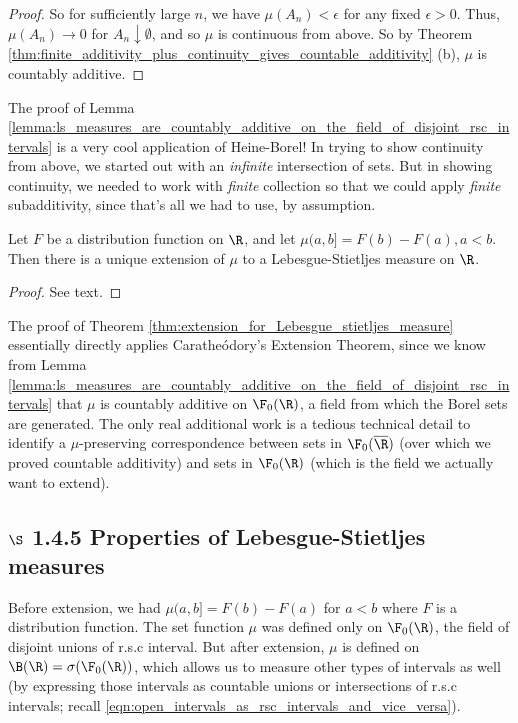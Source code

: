 \documentclass{article} %
\begin{document}
\begin{proof}
So for sufficiently large $n$, we have $\mu(A_n) < \epsilon$ for any fixed $\epsilon >0$. Thus, $\mu(A_n) \to 0$ for $A_n \downarrow \emptyset$, and so $\mu$ is continuous from above.  So by Theorem \ref{thm:finite_additivity_plus_continuity_gives_countable_additivity} (b), $\mu$ is countably additive.
\end{proof}

\begin{remark}
The proof of Lemma \ref{lemma:ls_measures_are_countably_additive_on_the_field_of_disjoint_rsc_intervals} is a very cool application of Heine-Borel!  In trying to show continuity from above, we started out with an \textit{infinite} intersection of sets.  But in showing continuity, we needed to work with \textit{finite} collection so that we could apply \textit{finite} subadditivity, since that's all we had to use, by assumption. 
\end{remark}

\begin{theorem}
Let $F$ be a distribution function on $\R$, and let $\mu(a,b] = F(b) - F(a), a < b$.  Then there is a unique extension of $\mu$ to a Lebesgue-Stietljes measure on $\R$.
\label{thm:extension_for_Lebesgue_stietljes_measure}
\end{theorem}

\begin{proof}
See text. 	
\end{proof}

\begin{remark}
The proof of Theorem \ref{thm:extension_for_Lebesgue_stietljes_measure}
essentially directly applies Carathe\'odory's Extension Theorem, since we know from Lemma \ref{lemma:ls_measures_are_countably_additive_on_the_field_of_disjoint_rsc_intervals} that $\mu$ is countably additive on $\F_0(\R)$, a field from which the Borel sets are generated.  The only real additional work is a tedious technical detail to identify a $\mu$-preserving correspondence between sets in $\F_0(\overline{\R})$ (over which we proved countable additivity) and sets in $\F_0(\R)$ (which is the field we actually want to extend).
\end{remark}

  \subsection{$\S$ 1.4.5 Properties of Lebesgue-Stietljes measures}
 Before extension, we had $\mu(a,b] =F(b) - F(a)$ for $a < b$ where $F$ is a distribution function. The set function $\mu$ was defined only on $\F_0(\R)$, the field of disjoint unions of r.s.c interval.  But after extension, $\mu$ is defined on $\B(\R) = \sigma(\F_0(\R))$, which allows us to measure other types of intervals as well (by expressing those intervals as countable unions or intersections of r.s.c intervals; recall \eqref{eqn:open_intervals_as_rsc_intervals_and_vice_versa}).
 
\end{document}
